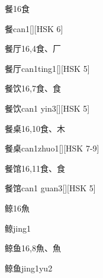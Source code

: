\begin{Entry}{餐}{16}{⾷}
  \begin{Phonetics}{餐}{can1}[][HSK 6]
  \end{Phonetics}
\end{Entry}

\begin{Entry}{餐厅}{16,4}{⾷、⼚}
  \begin{Phonetics}{餐厅}{can1ting1}[][HSK 5]
  \end{Phonetics}
\end{Entry}

\begin{Entry}{餐饮}{16,7}{⾷、⾷}
  \begin{Phonetics}{餐饮}{can1 yin3}[][HSK 5]
  \end{Phonetics}
\end{Entry}

\begin{Entry}{餐桌}{16,10}{⾷、⽊}
  \begin{Phonetics}{餐桌}{can1zhuo1}[][HSK 7-9]
  \end{Phonetics}
\end{Entry}

\begin{Entry}{餐馆}{16,11}{⾷、⾷}
  \begin{Phonetics}{餐馆}{can1 guan3}[][HSK 5]
  \end{Phonetics}
\end{Entry}

\begin{Entry}{鲸}{16}{⿂}
  \begin{Phonetics}{鲸}{jing1}
  \end{Phonetics}
\end{Entry}

\begin{Entry}{鲸鱼}{16,8}{⿂、⿂}
  \begin{Phonetics}{鲸鱼}{jing1yu2}
  \end{Phonetics}
\end{Entry}

